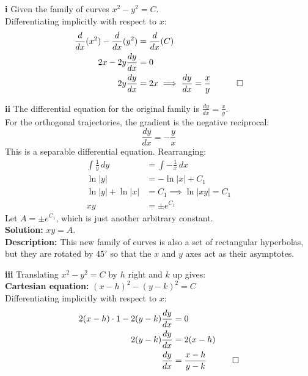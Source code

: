 \begin{solution}
\textbf{i} Given the family of curves $x^2 - y^2 = C$. \\
Differentiating implicitly with respect to $x$:
\begin{align*}
    \frac{d}{dx}(x^2) - \frac{d}{dx}(y^2) &= \frac{d}{dx}(C) \\
    2x - 2y \frac{dy}{dx} &= 0 \\
    2y \frac{dy}{dx} &= 2x \implies \frac{dy}{dx} = \frac{x}{y} \quad \qed
\end{align*}

\vspace{0.3cm}
\textbf{ii} The differential equation for the original family is $\frac{dy}{dx} = \frac{x}{y}$. \\
For the orthogonal trajectories, the gradient is the negative reciprocal:
\[ \frac{dy}{dx} = -\frac{y}{x} \]
This is a separable differential equation. Rearranging:
\begin{align*}
    \int \frac{1}{y} \, dy &= \int -\frac{1}{x} \, dx \\
    \ln|y| &= -\ln|x| + C_1 \\
    \ln|y| + \ln|x| &= C_1 \implies \ln|xy| = C_1 \\
    xy &= \pm e^{C_1}
\end{align*}
Let $A = \pm e^{C_1}$, which is just another arbitrary constant. \\
\textbf{Solution:} $xy = A$. \\
\textbf{Description:} This new family of curves is also a set of rectangular hyperbolas, but they are rotated by $45^\circ$ so that the $x$ and $y$ axes act as their asymptotes.

\vspace{0.3cm}
\textbf{iii} Translating $x^2 - y^2 = C$ by $h$ right and $k$ up gives: \\
\textbf{Cartesian equation:} $(x-h)^2 - (y-k)^2 = C$ \\
Differentiating implicitly with respect to $x$:
\begin{align*}
    2(x-h)\cdot 1 - 2(y-k) \frac{dy}{dx} &= 0 \\
    2(y-k) \frac{dy}{dx} &= 2(x-h) \\
    \frac{dy}{dx} &= \frac{x-h}{y-k} \quad \qed
\end{align*}


\end{solution}
